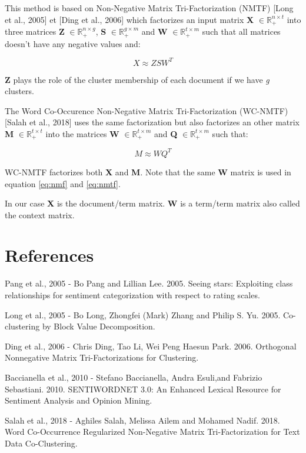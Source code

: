 \documentclass{article}
\begin{document}
This method is based on Non-Negative Matrix Tri-Factorization (NMTF) [Long et al., 2005] et [Ding et al., 2006] which factorizes an input matrix \textbf{X} $\in \mathbb{R}^{n \times t}_{+}$ into three matrices \textbf{Z} $\in \mathbb{R}^{n \times g}_{+}$, \textbf{S} $\in \mathbb{R}^{g \times m}_{+}$ and \textbf{W} $\in \mathbb{R}^{t \times m}_{+}$ such that all matrices doesn't have any negative values and:

\begin{equation}
X \approx ZSW^{T}
\label{eq:nmf}
\end{equation}

\textbf{Z} plays the role of the cluster membership of each document if we have \textit{g} clusters. 

The Word Co-Occurence Non-Negative Matrix Tri-Factorization (WC-NMTF) [Salah et al., 2018] uses the same factorization but also factorizes an other matrix \textbf{M} $\in \mathbb{R}^{t \times t}_{+}$ into the matrices \textbf{W} $\in \mathbb{R}^{t \times m}_{+}$ and \textbf{Q} $\in \mathbb{R}^{t \times m}_{+}$ such that:

\begin{equation}
M \approx WQ^{T}
\label{eq:nmtf}
\end{equation}

WC-NMTF factorizes both \textbf{X} and \textbf{M}. Note that the same \textbf{W} matrix is used in equation \ref{eq:nmf} and \ref{eq:nmtf}.

In our case \textbf{X} is the document/term matrix. \textbf{W} is a term/term matrix also called the context matrix.


\section*{References}

\begin{list_type}  
\item [Pang et al., 2005] - Bo Pang and Lillian Lee. 2005. Seeing stars: Exploiting class relationships for sentiment categorization with respect to rating scales. 
\item [Long et al., 2005] - Bo Long, Zhongfei (Mark) Zhang and Philip S. Yu. 2005. Co-clustering by Block Value Decomposition.
\item [Ding et al., 2006] - Chris Ding, Tao Li, Wei Peng Haesun Park. 2006. Orthogonal Nonnegative Matrix Tri-Factorizations for Clustering.
\item [Baccianella et al., 2010] - Stefano Baccianella, Andra Esuli,and Fabrizio Sebastiani. 2010. SENTIWORDNET 3.0: An Enhanced Lexical Resource for Sentiment Analysis and Opinion Mining.
\item [Salah et al., 2018] - Aghiles Salah, Melissa Ailem and Mohamed Nadif. 2018. Word Co-Occurrence Regularized Non-Negative Matrix Tri-Factorization for Text Data Co-Clustering.
\end{list_type}
\end{document}
